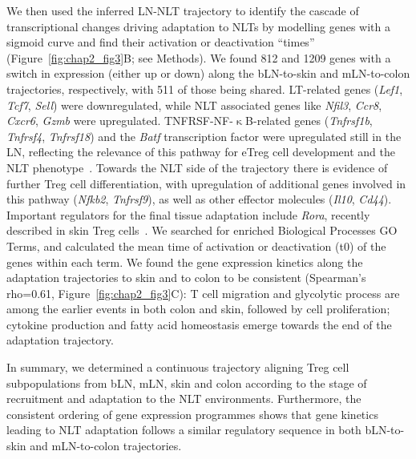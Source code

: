 We then used the inferred LN-NLT trajectory to identify the cascade of transcriptional changes driving adaptation to NLTs by modelling genes with a sigmoid curve and find their activation or deactivation “times” (Figure~\ref{fig:chap2_fig3}B; see Methods). We found 812 and 1209 genes with a switch in expression (either up or down) along the bLN-to-skin and mLN-to-colon trajectories, respectively, with 511 of those being shared. LT-related genes (\textit{Lef1}, \textit{Tcf7}, \textit{Sell}) were downregulated, while NLT associated genes like \textit{Nfil3}, \textit{Ccr8}, \textit{Cxcr6}, \textit{Gzmb} were upregulated. TNFRSF-NF-${\upkappa}$B-related genes (\textit{Tnfrsf1b}, \textit{Tnfrsf4}, \textit{Tnfrsf18}) and the \textit{Batf} transcription factor were upregulated still in the LN, reflecting the relevance of this pathway for eTreg cell development and the NLT phenotype~\citep{Vasanthakumar2017-ib,Vasanthakumar2015-jw}. Towards the NLT side of the trajectory there is evidence of further Treg cell differentiation, with upregulation of additional genes involved in this pathway (\textit{Nfkb2}, \textit{Tnfrsf9}), as well as other effector molecules (\textit{Il10}, \textit{Cd44}). Important regulators for the final tissue adaptation include \textit{Rora}, recently described in skin Treg cells~\citep{Malhotra2018-nz}. We searched for enriched Biological Processes GO Terms, and calculated the mean time of activation or deactivation (t0) of the genes within each term. We found the gene expression kinetics along the adaptation trajectories to skin and to colon to be consistent (Spearman’s rho=0.61, Figure~\ref{fig:chap2_fig3}C): T cell migration and glycolytic process are among the earlier events in both colon and skin, followed by cell proliferation; cytokine production and fatty acid homeostasis emerge towards the end of the adaptation trajectory.

In summary, we determined a continuous trajectory aligning Treg cell subpopulations from bLN, mLN, skin and colon according to the stage of recruitment and adaptation to the NLT environments. Furthermore, the consistent ordering of gene expression programmes shows that gene kinetics leading to NLT adaptation follows a similar regulatory sequence in both bLN-to-skin and mLN-to-colon trajectories.



